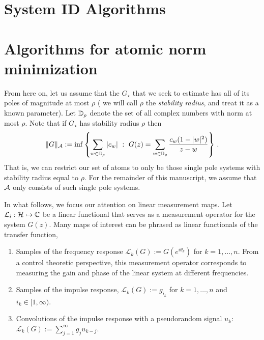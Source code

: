 \section{System ID Algorithms}

\section{Algorithms for atomic norm minimization}\label{sec:computation}

From here on, let us assume that the $G_\star$ that we seek to estimate has all of its poles of magnitude at most $\rho$  ( we will call $\rho$ the \emph{stability radius}, and treat it as a known parameter).  Let $\mathbb{D}_\rho$ denote the set of all complex numbers with norm at most $\rho$.  Note that if $G_\star$ has stability radius $\rho$ then
\[
	\|G\|_{\mathcal{A}}:=\inf\left\{ \sum_{w\in \mathbb{D}_\rho} |c_w|~:~G(z) = \sum_{w\in \mathbb{D}_\rho} \frac{c_w (1-|w|^2)}{z-w}\right\}\,.
\]
That is, we can restrict our set of atoms to only be those single pole systems with stability radius equal to $\rho$.  For the remainder of this manuscript, we assume that $\mathcal{A}$ only consists of such single pole systems.

In what follows, we focus our attention on linear measurement maps.  Let $\mathcal{L}_i: \mathcal{H} \mapsto \mathbb{C} $ be a linear functional that serves as a measurement operator for the system $G(z)$.  Many maps of interest can be phrased as linear functionals of the transfer function,
\begin{enumerate}
	\item Samples of the frequency response $\mathcal{L}_k(G):=G(e^{i\theta_k})$ for $k=1,\ldots, n$.  From a control theoretic perspective, this measurement operator corresponds to measuring the gain and phase of the linear system at different frequencies.
	\item Samples of the impulse response, $\mathcal{L}_k(G):=g_{i_k}$ for $k=1,\ldots, n$ and $i_k \in [1,\infty)$.
	\item Convolutions of the impulse response with a pseudorandom signal $u_k$: $\mathcal{L}_k(G):=\sum_{j=1}^{\infty} g_j u_{k-j}$.
\end{enumerate}

